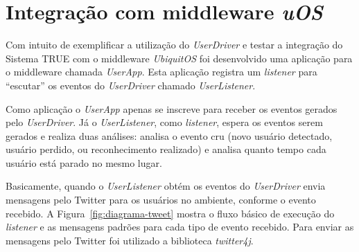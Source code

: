 \section{Integração com middleware \textit{uOS}}

	Com intuito de exemplificar a utilização do \textit{UserDriver} e testar a integração do Sistema TRUE com o middleware \textit{UbiquitOS} foi desenvolvido uma aplicação para o middleware chamada \textit{UserApp}. Esta aplicação registra um \textit{listener} para ``escutar'' os eventos do \textit{UserDriver} chamado \textit{UserListener}. 

	Como aplicação o \textit{UserApp} apenas se inscreve para receber os eventos gerados pelo \textit{UserDriver}. Já o \textit{UserListener}, como \textit{listener}, espera os eventos serem gerados e realiza duas análises: analisa o evento cru (novo usuário detectado, usuário perdido, ou reconhecimento realizado) e analisa quanto tempo cada usuário está parado no mesmo lugar.



	Basicamente, quando o \textit{UserListener} obtém os eventos do \textit{UserDriver} envia mensagens pelo Twitter para os usuários no ambiente, conforme o evento recebido. A Figura~\ref{fig:diagrama-tweet} mostra o fluxo básico de execução do \textit{listener} e as mensagens padrões para cada tipo de evento recebido. Para enviar as mensagens pelo Twitter foi utilizado a biblioteca \textit{twitter4j}. 

